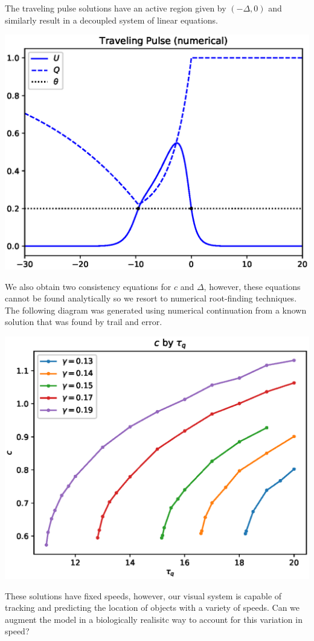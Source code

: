 \documentclass[landscape,final]{baposter}
\begin{document}
\begin{poster}
{	\vspace{.2cm}
}

{
	The traveling pulse solutions have an active region given by $(-\Delta, 0)$ and similarly result in a decoupled system of linear equations.
	\begin{center}
		\includegraphics[width=.45\linewidth]{pulse_profile}
	\end{center}
	We also obtain two consistency equations for $c$ and $\Delta$, however, these equations cannot be found analytically so we resort to numerical root-finding techniques. The following diagram was generated using numerical continuation from a known solution that was found by trail and error.
	\begin{center}
		\includegraphics[width=.45\linewidth]{pulse_bifurcation}
	\end{center}
}

{
	These solutions have fixed speeds, however, our visual system is capable of tracking and predicting the location of objects with a variety of speeds. Can we augment the model in a biologically realisitc way to account for this variation in speed?
	\bigbreak
	
}
\end{poster}
\end{document}
